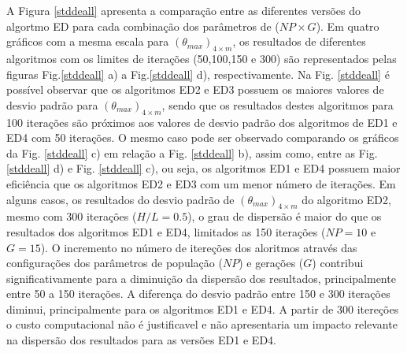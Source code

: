 \documentclass[12pt,A4,A4pt]{article}
\begin{document}
A Figura \ref{stddeall} apresenta a comparação entre as diferentes versões do algortmo ED para cada combinação dos parâmetros de  ($NP \times G$). Em quatro gráficos com a mesma escala para $({\theta}_{max})_{4\times m}$, os resultados de diferentes algoritmos com os limites de iterações (50,100,150 e 300) são representados pelas figuras Fig.\ref{stddeall} a) a Fig.\ref{stddeall} d), respectivamente. Na Fig. \ref{stddeall} é possível observar que os algoritmos ED2 e ED3 possuem os maiores valores de desvio padrão para $({\theta}_{max})_{4\times m}$, sendo que os resultados destes algoritmos para 100 iterações são próximos aos valores de desvio padrão dos algoritmos de ED1 e ED4 com 50 iterações. O mesmo caso pode ser observado comparando os gráficos da Fig. \ref{stddeall} c) em relação a Fig. \ref{stddeall} b), assim como, entre as Fig. \ref{stddeall} d) e Fig. \ref{stddeall} c), ou seja, os algoritmos ED1 e ED4 possuem maior eficiência que os algoritmos ED2 e ED3 com um menor número de iterações. Em alguns casos, os resultados do desvio padrão de $({\theta}_{max})_{4\times m}$ do algoritmo ED2, mesmo com 300 iterações ($H/L=0.5$), o grau de dispersão é maior do que os resultados dos algoritmos ED1 e ED4, limitados as 150 iterações ($NP=10$ e $G=15$). O incremento no número de itereções dos aloritmos através das configurações dos parâmetros de população ($NP$) e gerações ($G$) contribui significativamente para a diminuição da dispersão dos resultados, principalmente entre 50 a 150 iterações. A diferença do desvio padrão entre 150 e 300 iterações diminui, principalmente para os algoritmos ED1 e ED4. A partir de 300 itereções o custo computacional não é justificavel e não apresentaria um impacto relevante na dispersão dos resultados para as versões ED1 e ED4.  
\end{document}
